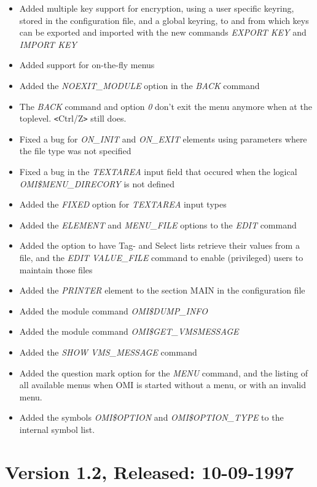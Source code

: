 \documentclass[a4paper]{book}
\newcommand{\lt}{\texttt{<}}
\newcommand{\gt}{\texttt{>}}
\begin{document}
\begin{itemize}
\item Added multiple key support for encryption, using a user specific keyring, stored in the configuration file, and a global keyring, to and from which keys can be exported and imported with the new commands \textsl{EXPORT KEY} and \textsl{IMPORT KEY}
\item Added support for on-the-fly menus
\item Added the \textsl{NOEXIT{\_}MODULE} option in the \textsl{BACK} command
\item The \textsl{BACK} command and option \textsl{0} don't exit the menu anymore when at the toplevel. \lt Ctrl/Z\gt{} still does.
\item Fixed a bug for \textsl{ON{\_}INIT} and \textsl{ON{\_}EXIT} elements using parameters where the file type was not specified
\item Fixed a bug in the \textsl{TEXTAREA} input field that occured when the logical \textsl{OMI{\$}MENU{\_}DIRECORY} is not defined
\item Added the \textsl{FIXED} option for \textsl{TEXTAREA} input types
\item Added the \textsl{ELEMENT} and \textsl{MENU{\_}FILE} options to the \textsl{EDIT} command
\item Added the option to have Tag- and Select lists retrieve their values from a file, and the \textsl{EDIT VALUE{\_}FILE} command to enable (privileged) users to maintain those files
\item Added the \textsl{PRINTER} element to the section MAIN in the configuration file
\item Added the module command \textsl{OMI{\$}DUMP{\_}INFO}
\item Added the module command \textsl{OMI{\$}GET{\_}VMSMESSAGE}
\item Added the \textsl{SHOW VMS{\_}MESSAGE} command
\item Added the question mark option for the \textsl{MENU} command, and the listing of all available menus when OMI is started without a menu, or with an invalid menu.
\item Added the symbols \textsl{OMI{\$}OPTION} and \textsl{OMI{\$}OPTION{\_}TYPE} to the internal symbol list.
\end{itemize}

\section*{Version 1.2, Released: 10-09-1997}
\end{document}
